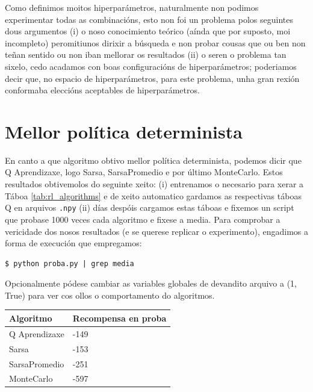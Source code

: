 \documentclass{article}
\begin{document}
Como definimos moitos hiperparámetros, naturalmente non podimos experimentar todas as combinacións, esto non foi un problema polos seguintes dous argumentos (i) o noso conocimiento teórico (aínda que por suposto, moi incompleto) peromitiunos dirixir a búsqueda e non probar cousas que ou ben non teñan sentido ou non iban mellorar os resultados (ii) o seren o problema tan sixelo, cedo acadamos con boas configuracións de hiperparámetros; poderiamos decir que, no espacio de hiperparámetros, para este problema, unha gran rexión conformaba eleccións aceptables de hiperparámetros. 

\newpage

\section{Mellor política determinista}

En canto a que algoritmo obtivo mellor política determinista, podemos dicir que Q Aprendizaxe, logo Sarsa, SarsaPromedio e por último MonteCarlo. Estos resultados obtivemolos do seguinte xeito: (i) entrenamos o necesario para xerar a Táboa \ref{tab:rl_algorithms} e de xeito automatico gardamos as respectivas táboas Q en arquivos \texttt{.npy} (ii) días despóis  cargamos estas táboas e fixemos un script que probase 1000 veces cada algoritmo e fixese a media. Para comprobar a vericidade dos nosos resultados (e se querese replicar o experimento), engadimos a forma de execución que empregamos: 


\begin{tcolorbox}[colback=black!5!white, colframe=black!75!white, title=Reproducir a táboa de debaixo]
\begin{lstlisting}[basicstyle=\ttfamily\small]
$ python proba.py | grep media
\end{lstlisting}
\end{tcolorbox}

Opcionalmente pódese cambiar as variables globales de devandito arquivo a (1, True) para ver cos ollos o comportamento do algoritmos.


\begin{table}[htbp]
\centering
\begin{tabular}{@{}ll@{}}
\toprule
Algoritmo     & Recompensa en proba \\ \midrule
Q Aprendizaxe & -149                                     \\ 
Sarsa         & -153                                     \\
SarsaPromedio & -251                                     \\
MonteCarlo    & -597                                     \\
\bottomrule
\end{tabular}
\end{table}
\end{document}
